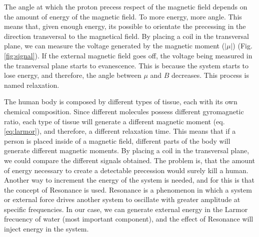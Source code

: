 The angle at which the proton precess respect of the magnetic field depends on the amount of energy of the magnetic field.
To more energy, more angle.
This means that, given enough energy, its possible to orientate the precessing in the direction transversal to the magnetical field.
By placing a coil in the transversal plane, we can measure the voltage generated by the magnetic moment ($|\mu|$) (Fig. \ref{fig:signal}).
If the external magnetic field goes off, the voltage being measured in the transversal plane starts to evanescence.
This is because the system starts to lose energy, and therefore, the angle between $\mu$ and $B$ decreases.
This process is named relaxation.


The human body is composed by different types of tissue, each with its own chemical composition.
Since different molecules possess different gyromagnetic ratio, each type of tissue will generate a different magnetic moment (eq. \ref{eq:larmor}), and therefore, a different relaxation time.
This means that if a person is placed inside of a magnetic field, different parts of the body will generate different magnetic moments.
By placing a coil in the transversal plane, we could compare the different signals obtained.
The problem is, that the amount of energy necessary to create a detectable precession would surely kill a human.
Another way to increment the energy of the system is needed, and for this is that the concept of Resonance is used.
Resonance is a phenomenon in which a system or external force drives another system to oscillate with greater amplitude at specific frequencies.
In our case, we can generate external energy in the Larmor frecuency of water (most important component), and the effect of Resonance will inject energy in the system.

